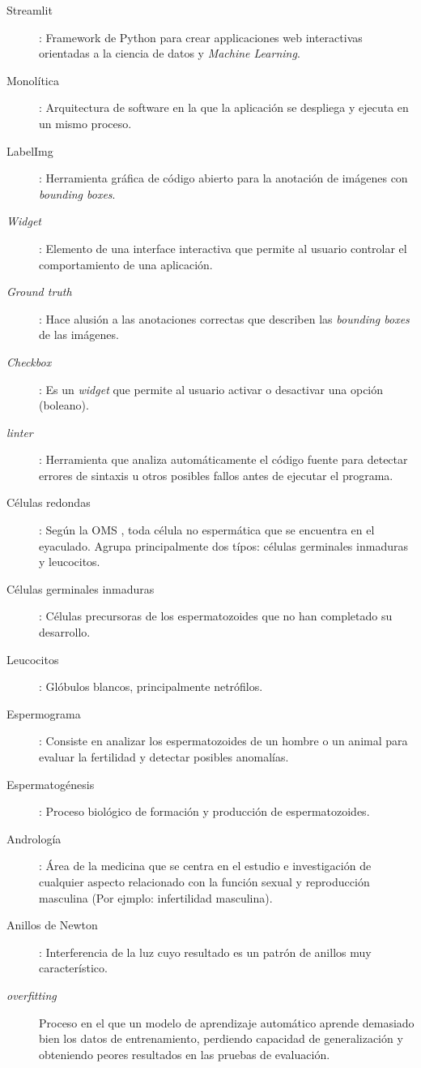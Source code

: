 \documentclass[12pt,a4paper,onecolumn,oneside]{report}
\begin{document}
\begin{description}
  \item[Streamlit]: Framework de Python para crear applicaciones web interactivas orientadas a la ciencia de datos y \textit{Machine Learning}.
  \item[Monolítica]: Arquitectura de software en la que la aplicación se despliega y ejecuta en un mismo proceso.     
  \item[LabelImg]: Herramienta gráfica de código abierto para la anotación de imágenes con \textit{bounding boxes}.
  \item[\textit{Widget}]: Elemento de una interface interactiva que permite al usuario controlar el comportamiento de una aplicación.
  \item[\textit{Ground truth}]: Hace alusión a las anotaciones correctas que describen las \textit{bounding boxes} de las imágenes.
  \item[\textit{Checkbox}]: Es un \textit{widget} que permite al usuario activar o desactivar una opción (boleano).  
  \item[\textit{linter}]:  Herramienta que analiza automáticamente el código fuente para detectar errores de sintaxis u otros posibles fallos antes de ejecutar el programa. 
  \item[Células redondas]: Según la OMS \cite{OMS}, toda célula no espermática que se encuentra en el eyaculado. Agrupa principalmente dos típos: células germinales inmaduras y leucocitos.
  \item[Células germinales inmaduras]: Células precursoras de los espermatozoides que no han completado su desarrollo.
  \item[Leucocitos]: Glóbulos blancos, principalmente netrófilos.  
  \item[Espermograma]: Consiste en analizar los espermatozoides de un hombre o un animal para evaluar la fertilidad y detectar posibles anomalías. 
  \item[Espermatogénesis]: Proceso biológico de formación y producción de espermatozoides.
  \item[Andrología]: Área de la medicina que se centra en el estudio e investigación de cualquier aspecto relacionado con la función sexual y reproducción masculina (Por ejmplo: infertilidad masculina).  
  \item[Anillos de Newton]: Interferencia de la luz cuyo resultado es un patrón de anillos muy característico.
  \item[\textit{overfitting}] Proceso en el que un modelo de aprendizaje automático aprende demasiado bien los datos de entrenamiento, perdiendo capacidad de generalización y obteniendo peores resultados en las pruebas de evaluación.

\end{description}
\end{document}
